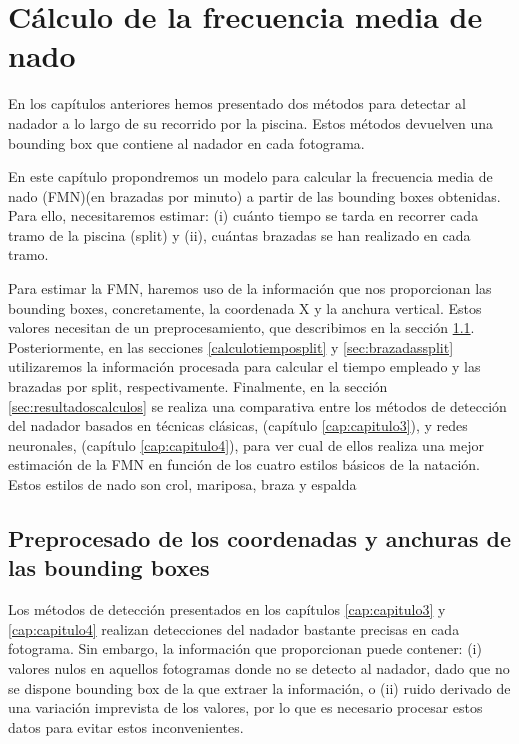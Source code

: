 \chapter{Cálculo de la frecuencia media de nado} \label{cap:capitulo5}

En los capítulos anteriores hemos presentado dos métodos para detectar al nadador a lo largo de su recorrido por la piscina. Estos métodos devuelven una bounding box que contiene al nadador en cada fotograma.

En este capítulo propondremos un modelo para calcular la frecuencia media de nado (FMN)(en brazadas por minuto) a partir de las bounding boxes obtenidas. Para ello, necesitaremos estimar: (i) cuánto tiempo se tarda en recorrer cada tramo de la piscina (split) y (ii), cuántas brazadas se han realizado en cada tramo.

Para estimar la FMN, haremos uso de la información que nos proporcionan las bounding boxes, concretamente, la coordenada X y la anchura vertical. Estos valores necesitan de un preprocesamiento, que describimos en la sección \ref{sec:preprocessdata}. Posteriormente, en las secciones \ref{calculotiemposplit} y \ref{sec:brazadassplit} utilizaremos la información procesada para calcular el tiempo empleado y las brazadas por split, respectivamente. Finalmente, en la sección \ref{sec:resultadoscalculos} se realiza una comparativa entre los métodos de detección del nadador basados en técnicas clásicas, (capítulo \ref{cap:capitulo3}), y redes neuronales, (capítulo \ref{cap:capitulo4}), para ver cual de ellos realiza una mejor estimación de la FMN en función de los cuatro estilos básicos de la natación. Estos estilos de nado son crol, mariposa, braza y espalda

\section{Preprocesado de los coordenadas y anchuras de las bounding boxes} \label{sec:preprocessdata}

Los métodos de detección presentados en los capítulos \ref{cap:capitulo3} y \ref{cap:capitulo4} realizan detecciones del nadador bastante precisas en cada fotograma. Sin embargo, la información que proporcionan puede contener: (i) valores nulos en aquellos fotogramas donde no se detecto al nadador, dado que no se dispone bounding box de la que extraer la información, o (ii) ruido derivado de una variación imprevista de los valores, por lo que es necesario procesar estos datos para evitar estos inconvenientes.

